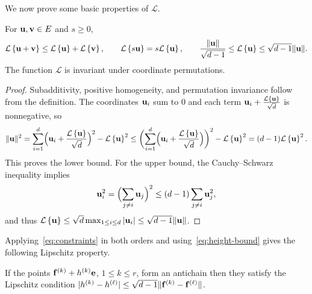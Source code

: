\documentclass[11pt,letterpaper]{article}
\begin{document}
We now prove some basic properties of $\mathcal L$.
\begin{lemma}
      For $\mathbf u,\mathbf v\in E$ and $s\ge0$,
      \begin{equation}\label{eq:height-bound}
            \mathcal L\left\{\mathbf u+\mathbf v\right\}\le\mathcal L\left\{\mathbf u\right\}+\mathcal L\left\{\mathbf v\right\},\qquad \mathcal L\left\{s\mathbf u\right\}=s\mathcal L\left\{\mathbf u\right\},\qquad \frac{\|\mathbf u\|}{\sqrt{d-1}}\le\mathcal L\left\{\mathbf u\right\} \le\sqrt{d-1}\|\mathbf u\|.
      \end{equation}
      The function $\mathcal L$ is invariant under coordinate permutations.
\end{lemma}
\begin{proof}
      Subadditivity, positive homogeneity, and permutation invariance follow from the definition. The coordinates $\mathbf u_i$ sum to $0$ and each term $\mathbf u_i+\frac{\mathcal L\left\{\mathbf u\right\}}{\sqrt{d}}$ is nonnegative, so
      \[
            \|\mathbf u\|^2 =\sum_{i=1}^d\Bigl(\mathbf u_i+\frac{\mathcal L\left\{\mathbf u\right\}}{\sqrt{d}}\Bigr)^2-\mathcal L\left\{\mathbf u\right\}^2 \le \biggl(\sum_{i=1}^d\Bigl(\mathbf u_i+\frac{\mathcal L\left\{\mathbf u\right\}}{\sqrt{d}}\Bigr)\biggr)^2-\mathcal L\left\{\mathbf u\right\}^2 = (d-1)\mathcal L\left\{\mathbf u\right\}^2.
      \]
      This proves the lower bound. For the upper bound, the Cauchy--Schwarz inequality implies
      \[
            \mathbf u_i^2=\Bigl(\sum_{j\ne i}\mathbf u_j\Bigr)^2 \le(d-1)\sum_{j\ne i}\mathbf u_j^2,
      \]
      and thus $\mathcal L\left\{\mathbf u\right\}\le\sqrt{d}\max_{1\le i\le d}|\mathbf u_i|\le\sqrt{d-1}\|\mathbf u\|$.
\end{proof}

Applying~\eqref{eq:constraints} in both orders and using~\eqref{eq:height-bound} gives the following Lipschitz property.

\begin{lemma}\label{lem:height}\label{cor:height}
      If the points $\mathbf f^{(k)}+h^{(k)}\mathbf e$, $1\le k\le r$, form an antichain then they satisfy the Lipschitz condition $|h^{(k)}-h^{(\ell)}|\le\sqrt{d-1}\|\mathbf f^{(k)}-\mathbf f^{(\ell)}\|$.
\end{lemma}
\end{document}
